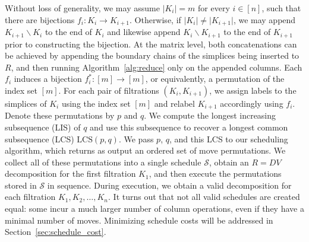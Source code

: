 \documentclass{siamart190516}
\begin{document}
Without loss of generality, we may assume $\lvert K_i \rvert = m$ for every $i \in [n]$, 
such that there are  bijections $f_i : K_i \to K_{i+1}$. 
Otherwise, if $\lvert K_i \rvert \neq \lvert K_{i+1} \rvert$,   
we may append $K_{i+1} \smallsetminus K_i$ to the end of $K_i$ and likewise append $K_{i} \smallsetminus K_{i+1}$ to the end of $K_{i+1}$ prior to constructing the bijection. 
At the matrix level, both concatenations can be achieved by appending the boundary chains of the simplices being inserted to $R$, and then running Algorithm~\ref{alg:reduce} only on the appended columns. 
Each $f_i$ induces a bijection $f_i^\ast : [m] \to [m]$, or equivalently, a permutation of the index set $[m]$. For each pair of filtrations $(K_i, K_{i+1})$, we assign labels to the simplices of $K_i$ using the index set $[m]$ and relabel $K_{i+1}$ accordingly using $f_i$. Denote these permutations by $p$ and $q$. 
We compute the longest increasing subsequence (LIS) of $q$ and use this subsequence to recover a longest common subsequence (LCS) $\mathrm{LCS}(p,q)$. We pass $p$, $q$, and this LCS to our scheduling algorithm, which returns as output an ordered set of move permutations. We collect all of these permutations into a single schedule $\mathcal{S}$, obtain an $R=DV$ decomposition for the first filtration $K_1$, and then execute the permutations stored in $\mathcal{S}$ in sequence. During execution, we obtain a valid decomposition for each filtration $K_1, K_2, \dots, K_n$. 
It turns out that not all valid schedules are created equal:
some incur a much larger number of column operations,
even if they have a minimal number of moves. 
Minimizing schedule costs will be addressed in 
Section~\ref{sec:schedule_cost}.
\end{document}
